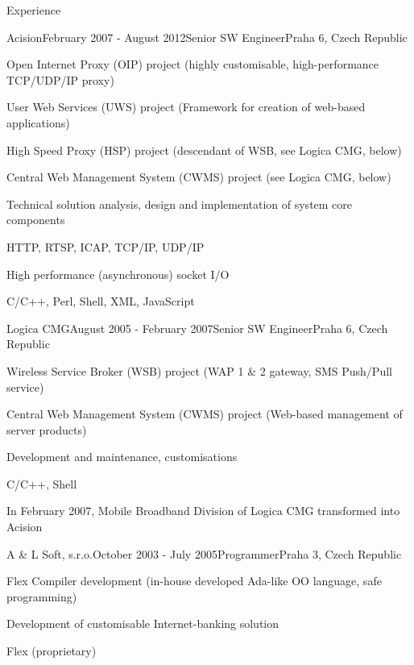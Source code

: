 \documentclass{resume} %
\begin{document}
\begin{rSection}{Experience}
\begin{rSubsection}{Acision}{February 2007 - August 2012}{Senior SW Engineer}{Praha 6, Czech Republic}
\item Open Internet Proxy (OIP) project (highly customisable, high-performance TCP/UDP/IP proxy)
\item User Web Services (UWS) project (Framework for creation of web-based applications)
\item High Speed Proxy (HSP) project (descendant of WSB, see Logica CMG, below)
\item Central Web Management System (CWMS) project (see Logica CMG, below)
\item Technical solution analysis, design and implementation of system core components
\item HTTP, RTSP, ICAP, TCP/IP, UDP/IP
\item High performance (asynchronous) socket I/O
\item C/C++, Perl, Shell, XML, JavaScript
\end{rSubsection}


\begin{rSubsection}{Logica CMG}{August 2005 - February 2007}{Senior SW Engineer}{Praha 6, Czech Republic}
\item Wireless Service Broker (WSB) project (WAP 1 \& 2 gateway, SMS Push/Pull service)
\item Central Web Management System (CWMS) project (Web-based management of server products)
\item Development and maintenance, customisations
\item C/C++, Shell
\item In February 2007, Mobile Broadband Division of Logica CMG transformed into Acision
\end{rSubsection}


\begin{rSubsection}{A \& L Soft, s.r.o.}{October 2003 - July 2005}{Programmer}{Praha 3, Czech Republic}
\item Flex Compiler development (in-house developed Ada-like OO language, safe programming)
\item Development of customisable Internet-banking solution
\item Flex (proprietary)
\end{rSubsection}

\end{rSection}
\end{document}
